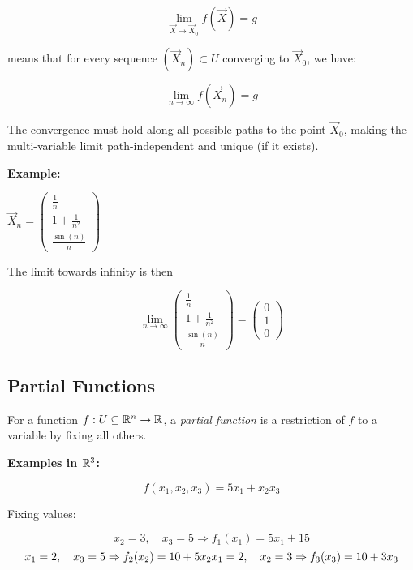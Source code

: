 \[
    \lim_{\vec{X} \to \vec{X}_0} f(\vec{X}) = g
\]

means that for every sequence \( (\vec{X}_n) \subset U \) converging to \( \vec{X}_0 \), we have:

\[
    \lim_{n \to \infty} f(\vec{X}_n) = g
\]

The convergence must hold along all possible paths to the point \( \vec{X}_0 \), making the 
multi-variable limit path-independent and unique (if it exists).
\vspace{\baselineskip}

\textbf{Example:}
\vspace{\baselineskip}

\(\vec{X}_n = \begin{pmatrix} \frac{1}{n} \\ 1 + \frac{1}{n^2} \\ \frac{\sin(n)}{n} \end{pmatrix}\)
\vspace{\baselineskip}

The limit towards infinity is then 

\[
    \lim_{n \to \infty} \begin{pmatrix} \frac{1}{n} \\ 1 + \frac{1}{n^2} \\ \frac{\sin(n)}{n} \end{pmatrix}
    = \begin{pmatrix}
        0 \\ 1 \\ 0
    \end{pmatrix}
\]

\subsection{Partial Functions}

For a function \( f: U \subseteq \mathbb{R}^n \to \mathbb{R} \), a \emph{partial function} is a 
restriction of \(f\) to a variable by fixing all others.
\vspace{\baselineskip}

\textbf{Examples in \( \mathbb{R}^3 \):}

\[
    f(x_1, x_2, x_3) = 5x_1 + x_2 x_3
\]

Fixing values:

\[
    x_2 = 3, \quad x_3 = 5 \Rightarrow f_1(x_1) = 5x_1 + 15 
\]
\[
    x_1 = 2, \quad x_3 = 5 \Rightarrow f_2(x_2) = 10 + 5x_2 \\
    x_1 = 2, \quad x_2 = 3 \Rightarrow f_3(x_3) = 10 + 3x_3
\]

